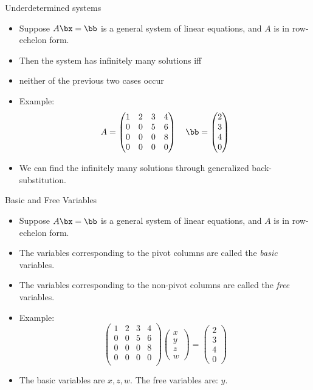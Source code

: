 \documentclass{beamer}
\begin{document}
\begin{frame}{Underdetermined systems}

\begin{itemize}
\item Suppose $A\bx=\bb$ is a general system of linear equations, and $A$ is in row-echelon form.
\item Then the system has infinitely many solutions iff
\item neither of the previous two cases occur
\item Example:
$$
A =
\begin{pmatrix}
1 & 2 & 3 & 4 \\
0 & 0 & 5 & 6 \\
0 & 0 & 0 & 8 \\
0 & 0 & 0 & 0 \\
\end{pmatrix}
\quad
\bb=
\begin{pmatrix}
2 \\ 3 \\ 4 \\ 0
\end{pmatrix}
$$
\item We can find the infinitely many solutions through generalized back-substitution.

\end{itemize}
\end{frame}

\begin{frame}{Basic and Free Variables}

\begin{itemize}
\item Suppose $A\bx=\bb$ is a general system of linear equations, and $A$ is in row-echelon form.
\item The variables corresponding to the pivot columns are called the \emph{basic} variables.
\item The variables corresponding to the non-pivot columns are called the \emph{free} variables.
\item Example:
$$
\begin{pmatrix}
1 & 2 & 3 & 4 \\
0 & 0 & 5 & 6 \\
0 & 0 & 0 & 8 \\
0 & 0 & 0 & 0 \\
\end{pmatrix}
\begin{pmatrix}
x \\ y \\ z \\ w
\end{pmatrix}
=
\begin{pmatrix}
2 \\ 3 \\ 4 \\ 0
\end{pmatrix}
$$
\item The basic variables are $x,z,w$. The free variables are: $y$.
\end{itemize}
\end{frame}
\end{document}
